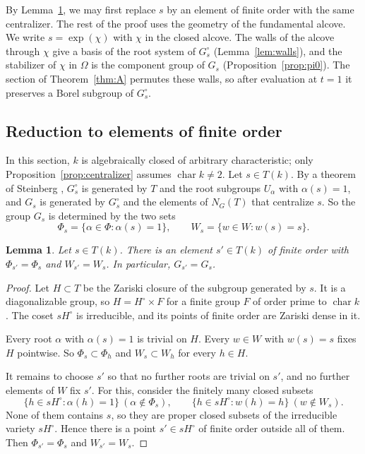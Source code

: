 \documentclass[psamsfonts]{amsart}
\newtheorem{lem}[thm]{Lemma}
\theoremstyle{definition}
\theoremstyle{remark}
\numberwithin{equation}{section}
\DeclareMathOperator{\chara}{char}
\numberwithin{equation}{section}
\newcommand{\Om}{\Omega}
\theoremstyle{plain}
\begin{document}
By Lemma~\ref{lem:finite-order}, we may first replace $s$ by an element of finite order with the same centralizer. The rest of the proof uses the geometry of the fundamental alcove. We write $s=\exp(\chi)$ with $\chi$ in the closed alcove. The walls of the alcove through $\chi$ give a basis of the root system of $G_s^{\circ}$ (Lemma~\ref{lem:walls}), and the stabilizer of $\chi$ in $\Om$ is the component group of $G_s$ (Proposition~\ref{prop:pi0}). The section of Theorem~\ref{thm:A} permutes these walls, so after evaluation at $t=1$ it preserves a Borel subgroup of $G_s^{\circ}$.

\subsection{Reduction to elements of finite order}
In this section, $k$ is algebraically closed of arbitrary characteristic; only Proposition~\ref{prop:centralizer} assumes $\chara k\neq2$. Let $s\in T(k)$. By a theorem of Steinberg \cite[II,~4.1]{SS70}, $G_s^{\circ}$ is generated by $T$ and the root subgroups $U_\alpha$ with $\alpha(s)=1$, and $G_s$ is generated by $G_s^{\circ}$ and the elements of $N_G(T)$ that centralize $s$. So the group $G_s$ is determined by the two sets
\[
\Phi_s=\{\alpha\in\Phi:\alpha(s)=1\},\qquad W_s=\{w\in W:w(s)=s\}.
\]

\begin{lem}\label{lem:finite-order}
Let $s\in T(k)$. There is an element $s'\in T(k)$ of finite order with $\Phi_{s'}=\Phi_s$ and $W_{s'}=W_s$. In particular, $G_{s'}=G_s$.
\end{lem}

\begin{proof}
Let $H\subset T$ be the Zariski closure of the subgroup generated by $s$. It is a diagonalizable group, so $H=H^{\circ}\times F$ for a finite group $F$ of order prime to $\chara k$. The coset $sH^{\circ}$ is irreducible, and its points of finite order are Zariski dense in it.

Every root $\alpha$ with $\alpha(s)=1$ is trivial on $H$. Every $w\in W$ with $w(s)=s$ fixes $H$ pointwise. So $\Phi_s\subset\Phi_{h}$ and $W_s\subset W_{h}$ for every $h\in H$.

It remains to choose $s'$ so that no further roots are trivial on $s'$, and no further elements of $W$ fix $s'$. For this, consider the finitely many closed subsets
\[
\{h\in sH^{\circ}:\alpha(h)=1\}\ (\alpha\notin\Phi_s),\qquad\{h\in sH^{\circ}:w(h)=h\}\ (w\notin W_s).
\]
None of them contains $s$, so they are proper closed subsets of the irreducible variety $sH^{\circ}$. Hence there is a point $s'\in sH^{\circ}$ of finite order outside all of them. Then $\Phi_{s'}=\Phi_s$ and $W_{s'}=W_s$.
\end{proof}
\end{document}
